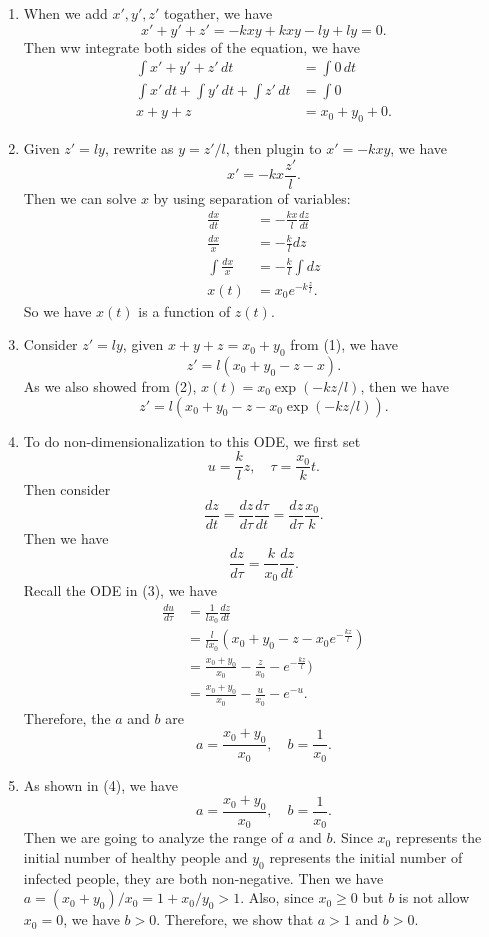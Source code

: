 \documentclass[12pt]{exam}
\begin{document}
\begin{enumerate}
	\item When we add $x', y', z'$ togather, we have
		\[x'+y'+z' = -kxy+kxy-ly+ly = 0.\]
		Then ww integrate both sides of the equation, we have
		\begin{align*}
			\int x'+y'+z' \, dt &= \int 0 \, dt \\
			\int x' \, dt + \int y' \, dt + \int z' \, dt &= \int 0 \\
			x+y+z &= x_0+y_0 +0.
		\end{align*}
	
	\item Given $z'=ly$, rewrite as $y=z'/l$, then plugin to $x'=-kxy$, we have
		\[x'=-kx\frac{z'}{l}.\]
		Then we can solve $x$ by using separation of variables:
		\begin{align*}
			\frac{dx}{dt} &= -\frac{kx}{l}\frac{dz}{dt} \\
			\frac{dx}{x} &= -\frac{k}{l}dz \\
			\int \frac{dx}{x} &= -\frac{k}{l}\int dz \\
			x(t) &= x_0e^{-k\frac{z}{l}}.
		\end{align*}
		So we have $x(t)$ is a function of $z(t)$.

	\item Consider $z'=ly$, given $x+y+z=x_0+y_0$ from (1), we have
		\[z' = l(x_0+y_0-z-x).\]
		As we also showed from (2), $x(t) = x_0\exp(-kz/l)$, then we have
		\[z' = l(x_0+y_0-z-x_0\exp(-kz/l)).\]
		
	\item To do non-dimensionalization to this ODE, we first set
					\[u = \frac{k}{l}z, \quad \tau = \frac{x_0}{k}t.\]
		Then consider
		\[\frac{dz}{dt} = \frac{dz}{d\tau}\frac{d\tau}{dt} = \frac{dz}{d\tau}\frac{x_0}{k}.\]
		Then we have
		\[\frac{dz}{d\tau} = \frac{k}{x_0}\frac{dz}{dt}.\]
		Recall the ODE in (3), we have
		\begin{align*}
			\frac{du}{d\tau} &= \frac{1}{lx_0}\frac{dz}{dt} \\
					 &= \frac{l}{lx_0}(x_0+y_0-z-x_0 e^{-\frac{kz}{l}}) \\
			&= \frac{x_0+y_0}{x_0}-\frac{z}{x_0}-e^{-\frac{kz}{l}}) \\
			&= \frac{x_0+y_0}{x_0}-\frac{u}{x_0}-e^{-u}.
		\end{align*}
		Therefore, the $a$ and $b$ are	
		\[a = \frac{x_0+y_0}{x_0}, \quad b = \frac{1}{x_0}.\]
		
	\item As shown in (4), we have
		\[a=\frac{x_0+y_0}{x_0}, \quad b=\frac{1}{x_0}.\]
		Then we are going to analyze the range of $a$ and $b$.
	Since $x_0$ represents the initial number of healthy people and $y_0$ represents the initial number of infected people, they are both non-negative. Then we have $a=(x_0+y_0)/x_0=1+x_0/y_0 > 1$. Also, since $x_0 \geq 0$ but $b$ is not allow $x_0=0$, we have $b > 0$. Therefore, we show that $a>1$ and $b>0$.






\end{enumerate}
\end{document}
